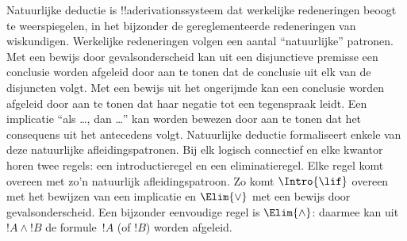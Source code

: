 \documentclass[openany]{memoir}
\begin{document}
\begingroup
\def\olfilename{OLP-0066}
\def\olfilepath{content/first-order-logic/proof-systems/}
\hypertarget{unit-OLP-0066}{}



      {}
      {}


Natuurlijke deductie is !!a{derivation}ssysteem dat werkelijke
redeneringen beoogt te weerspiegelen, in het bijzonder de
gereglementeerde redeneringen van wiskundigen. Werkelijke redeneringen
volgen een aantal ``natuurlijke'' patronen. Met een bewijs door
gevalsonderscheid kan uit een disjunctieve premisse een conclusie worden
afgeleid door aan te tonen dat de conclusie uit elk van de disjuncten
volgt. Met een bewijs uit het ongerijmde kan een conclusie worden
afgeleid door aan te tonen dat haar negatie tot een tegenspraak leidt.
Een implicatie ``als \dots, dan \dots'' kan worden bewezen door aan te
tonen dat het consequens uit het antecedens volgt. Natuurlijke deductie
formaliseert enkele van deze natuurlijke afleidingspatronen. Bij elk
logisch connectief en elke kwantor horen twee regels: een
introductieregel en een eliminatieregel. Elke regel komt overeen met
zo'n natuurlijk afleidingspatroon. Zo komt $\Intro{\lif}$ overeen met
het bewijzen van een implicatie en $\Elim{\lor}$ met een bewijs door
gevalsonderscheid. Een bijzonder eenvoudige regel is $\Elim{\land}$:
daarmee kan uit $!A \land !B$ de formule~$!A$ (of $!B$) worden afgeleid.
\end{document}
